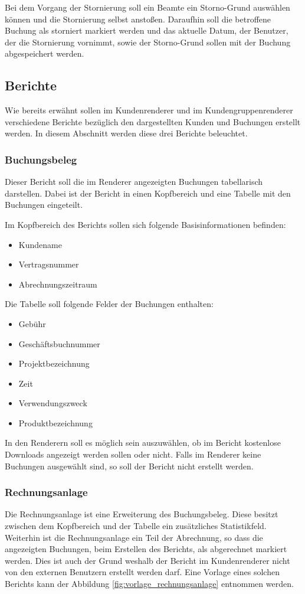 Bei dem Vorgang der Stornierung soll ein Beamte ein Storno-Grund auswählen können und die Stornierung selbst anstoßen. Daraufhin soll die betroffene Buchung als storniert markiert werden und das aktuelle Datum, der Benutzer, der die Stornierung vornimmt, sowie der Storno-Grund sollen mit der Buchung abgespeichert werden.

\subsection{Berichte}
Wie bereits erwähnt sollen im Kundenrenderer und im Kundengruppenrenderer verschiedene Berichte bezüglich den dargestellten Kunden und Buchungen erstellt werden. In diesem Abschnitt werden diese drei Berichte beleuchtet.  

\subsubsection{Buchungsbeleg}
Dieser Bericht soll die im Renderer angezeigten Buchungen tabellarisch darstellen.
Dabei ist der Bericht in einen Kopfbereich und eine Tabelle mit den Buchungen eingeteilt.

Im Kopfbereich des Berichts sollen sich folgende Basisinformationen befinden:
\begin{itemize}
  \item Kundename 
  \item Vertragsnummer
  \item Abrechnungszeitraum
\end{itemize}  
Die Tabelle soll folgende Felder der Buchungen enthalten: 
\begin{itemize}
 \item Gebühr
 \item Geschäftsbuchnummer 
 \item Projektbezeichnung
 \item Zeit
 \item Verwendungszweck
 \item Produktbezeichnung
\end{itemize}

In den Renderern soll es möglich sein auszuwählen, ob im Bericht kostenlose Downloads angezeigt werden sollen oder nicht.
Falls im Renderer keine Buchungen ausgewählt sind, so soll der Bericht nicht erstellt werden.

\subsubsection{Rechnungsanlage}
Die Rechnungsanlage ist eine Erweiterung des Buchungsbeleg.
Diese besitzt zwischen dem Kopfbereich und der Tabelle ein zusätzliches Statistikfeld.
Weiterhin ist die Rechnungsanlage ein Teil der Abrechnung, so dass die angezeigten Buchungen, beim Erstellen des Berichts, als abgerechnet markiert werden. Dies ist auch der Grund weshalb der Bericht im Kundenrenderer nicht von den externen Benutzern erstellt werden darf.
Eine Vorlage eines solchen Berichts kann der Abbildung \vref{fig:vorlage_rechnungsanlage} entnommen werden.

